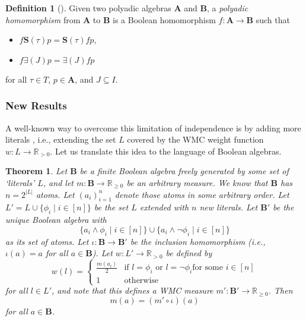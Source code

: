\documentclass{article}
\newtheorem{theorem}{Theorem}
\theoremstyle{definition}
\newtheorem{definition}{Definition}
\theoremstyle{remark}
\begin{document}
\begin{definition}[\cite{halmos2016algebraic}]
  Given two polyadic algebras $\mathbf{A}$ and $\mathbf{B}$, a \emph{polyadic
    homomorphism} from $\mathbf{A}$ to $\mathbf{B}$ is a Boolean homomorphism $f
  : \mathbf{A} \to \mathbf{B}$ such that
  \begin{itemize}
  \item $f\mathbf{S}(\tau)p = \mathbf{S}(\tau)fp$,
  \item $f\bm\exists(J)p = \bm\exists(J)fp$
  \end{itemize}
  for all $\tau \in T$, $p \in \mathbf{A}$, and $J \subseteq I$.
\end{definition}

\subsubsection{New Results}

A well-known way to overcome this limitation of independence is by adding more
literals \cite{DBLP:journals/ai/ChaviraD08}, i.e., extending the set $L$ covered
by the WMC weight function $w : L \to \mathbb{R}_{>0}$. Let us translate this
idea to the language of Boolean algebras.

\begin{theorem} \label{thm:extension} %
  Let $\mathbf{B}$ be a finite Boolean algebra freely generated by some set of
  `literals' $L$, and let $m : \mathbf{B} \to \mathbb{R}_{\ge 0}$ be an
  arbitrary measure. We know that $\mathbf{B}$ has $n = 2^{|L|}$ atoms. Let
  $(a_i)_{i=1}^n$ denote those atoms in some arbitrary order. Let $L' = L \cup
  \{ \phi_i \mid i \in [n] \}$ be the set $L$ extended with $n$ new literals.
  Let $\mathbf{B'}$ be the unique Boolean algebra with
  \[
    \{ a_i \land \phi_i \mid i \in [n] \} \cup \{ a_i \land \neg \phi_i \mid i
    \in [n] \}
  \]
  as its set of atoms. Let $\iota : \mathbf{B} \to \mathbf{B'}$ be the inclusion
  homomorphism (i.e., $\iota(a) = a$ for all $a \in \mathbf{B}$). Let $w : L'
  \to \mathbb{R}_{> 0}$ be defined by
  \[
    w(l) = \begin{cases}
      \frac{m(a_i)}{2} & \text{if } l = \phi_i \text{ or } l = \neg\phi_i \text{
        for some } i \in [n] \\
      1 & \text{otherwise}
    \end{cases}
  \]
  for all $l \in L'$, and note that this defines a WMC measure $m' : \mathbf{B'}
  \to \mathbb{R}_{\ge 0}$. Then
  \[
    m(a) = (m' \circ \iota)(a)
  \]
  for all $a \in \mathbf{B}$.
\end{theorem}
\end{document}
